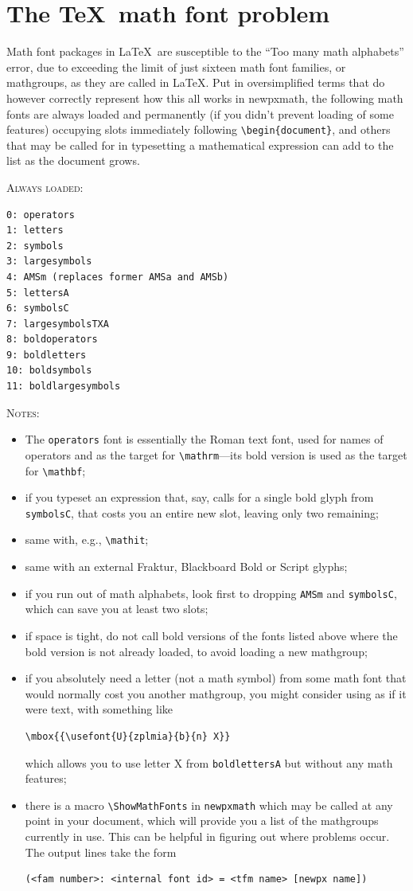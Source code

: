 \documentclass[11pt]{article}
\theoremstyle{oldplain}
\theoremstyle{plain}
\begin{document}
\section{The \TeX\ math font problem}
Math font packages in \LaTeX\ are susceptible to the ``Too many math alphabets'' error, due to exceeding the limit of just sixteen math font families, or mathgroups, as they are called in \LaTeX. Put in oversimplified terms that do however correctly represent how this all works in \textsf{newpxmath}, the following math fonts are always loaded and permanently (if you didn't prevent loading of some features) occupying slots immediately following \verb|\begin{document}|, and others that may be called for in typesetting a mathematical expression can add to the list as the document grows.

\textsc{Always loaded:}
\begin{verbatim}
0: operators
1: letters
2: symbols
3: largesymbols
4: AMSm (replaces former AMSa and AMSb)
5: lettersA
6: symbolsC
7: largesymbolsTXA
8: boldoperators
9: boldletters
10: boldsymbols
11: boldlargesymbols
\end{verbatim}
\textsc{Notes:}
\begin{itemize}
\item
The {\tt operators} font is essentially the Roman text font, used for names of operators and as the target for \verb|\mathrm|---its bold version is used as the target for \verb|\mathbf|;
\item if you typeset an expression that, say, calls for a single bold glyph from  {\tt symbolsC}, that costs you an entire new slot, leaving only two remaining;
\item same with, e.g., \verb|\mathit|;
\item same with an external Fraktur, Blackboard Bold or Script glyphs;
\item if you run out of math alphabets, look first to dropping {\tt AMSm} and  {\tt symbolsC}, which can save you at least two slots;
\item if space is tight, do not call bold versions of the fonts listed above where the bold version is not already loaded, to avoid loading a new mathgroup; 
\item if you absolutely need a letter (not a math symbol) from some math font that would normally cost you another mathgroup, you might consider using as if it were text, with something like
\begin{verbatim}
\mbox{{\usefont{U}{zplmia}{b}{n} X}}
\end{verbatim}
which allows you to use letter X from {\tt boldlettersA} but without any math features;
\item there is a macro \verb|\ShowMathFonts| in {\tt newpxmath} which may be called at any point in your document, which will provide you a list of the mathgroups currently in use. This can be helpful in figuring out where problems occur. The output lines take the form
\begin{verbatim}
(<fam number>: <internal font id> = <tfm name> [newpx name])
\end{verbatim}

\end{itemize}
\end{document}
